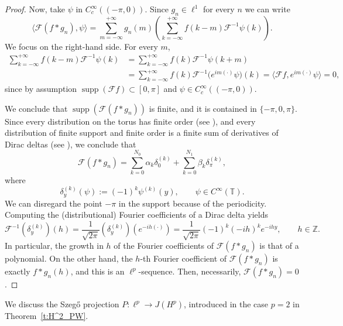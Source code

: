 \documentclass[12pt,a4paper,reqno]{amsart}
\DeclareMathOperator*{\supp}{supp}
\theoremstyle{definition}
\theoremstyle{definition}\newtheorem{defn}[thm]{Definition}
\begin{document}
\begin{proof}
    
    Now, take $\psi$ in $C_c^\infty((-\pi,0)).$ Since $g_n\in\ell^1$ for every $n$ we can write
    \[
     \langle \mathcal F(f\ast  g_n),\psi\rangle =\sum_{m=-\infty}^{+\infty} g_n(m)\left(\sum_{k=-\infty}^{+\infty} f(k-m) \mathcal{F}^{-1}\psi(k)\right).
    \]
    We focus on the right-hand side. For every $m$,
    \begin{align*}
        \sum_{k=-\infty}^{+\infty} f(k-m) \mathcal{F}^{-1}\psi(k)&=\sum_{k=-\infty}^{+\infty} f(k) \mathcal{F}^{-1}\psi(k+m)\\
        &=\sum_{k=-\infty}^{+\infty} f(k) \mathcal{F}^{-1}\big(e^{im(\cdot)}\psi\big)(k)=\langle \mathcal{F}f,e^{im(\cdot)}\psi\rangle=0,
    \end{align*}
    since by assumption $\supp(\mathcal Ff)\subset [0,\pi]$ and $\psi\in C_c^\infty((-\pi,0))$. 
    
    
    
     We conclude that $\supp(\mathcal F(f\ast g_n))$ is finite, and it is contained in $\{-\pi,0,\pi\}.$ Since every distribution on the torus has finite order (see \cite[Theorem 6.2]{beals}), and every distribution of finite support and finite order is a finite sum of derivatives of Dirac deltas (see \cite[Theorem 2.3.4]{hormander1983analysis}), we conclude that
    \[
    \mathcal F(f\ast g_n) = \sum_{k=0}^{N_0} \alpha_k \delta_0^{(k)} + \sum_{k=0}^{N_1} \beta_k \delta_{\pi}^{(k)},
    \]
    where 
    \[
    \delta_y^{(k)}(\psi):=(-1)^k \psi^{(k)}(y), \qquad \psi\in C^\infty(\mathbb{T}).
    \]
    We can disregard the point $-\pi$ in the support because of the periodicity. Computing the (distributional) Fourier coefficients of a Dirac delta yields
    \[
    \mathcal{F}^{-1}(\delta_y^{(k)})(h)=\frac{1}{\sqrt{2\pi}}(\delta_y^{(k)})(e^{-ih(\cdot)})=\frac{1}{\sqrt{2\pi}} (-1)^k(-ih)^k e^{-ihy}, \qquad h\in\mathbb Z.
    \]
    In particular, the growth in $h$ of the Fourier coefficients of $\mathcal F(f\ast g_n)$ is that of a polynomial. On the other hand, the $h$-th Fourier coefficient of $\mathcal F(f\ast g_n)$ is exactly $f\ast g_n(h)$, and this is an $\ell^p$-sequence. Then, necessarily, $\mathcal{F}(f\ast g_n)=0$.
    \end{proof}
    
    We discuss the Szeg\H o projection $P\colon\ell^p\to J(H^p)$, introduced in the case $p=2$ in Theorem~\ref{t:H^2_PW}. 
    
\end{document}
